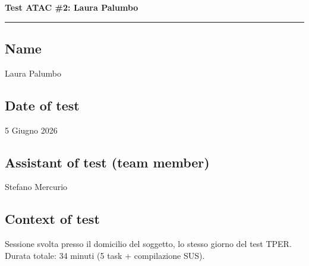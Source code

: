 \documentclass[11pt,a4paper]{article}
\begin{document}

\newpage
\begin{center}
  {\color{secondaryColor}\large\bfseries
  Test ATAC \#2: Laura Palumbo}\\
  \vspace{0.1cm}
  \color{borderColor}\hrule
\end{center}

\vspace{0.5cm}

\subsection*{Name}
\begin{tcolorbox}[colback=backgroundColor,colframe=borderColor,arc=2mm]
Laura Palumbo
\end{tcolorbox}

\subsection*{Date of test}
\begin{tcolorbox}[colback=backgroundColor,colframe=borderColor,arc=2mm]
5 Giugno 2026
\end{tcolorbox}

\subsection*{Assistant of test (team member)}
\begin{tcolorbox}[colback=backgroundColor,colframe=borderColor,arc=2mm]
Stefano Mercurio
\end{tcolorbox}

\subsection*{Context of test}
\begin{tcolorbox}[colback=backgroundColor,colframe=borderColor,arc=2mm]
Sessione svolta presso il domicilio del soggetto, lo stesso giorno del test TPER. Durata totale: 34 minuti (5 task +
compilazione SUS).
\end{tcolorbox}
\end{document}
